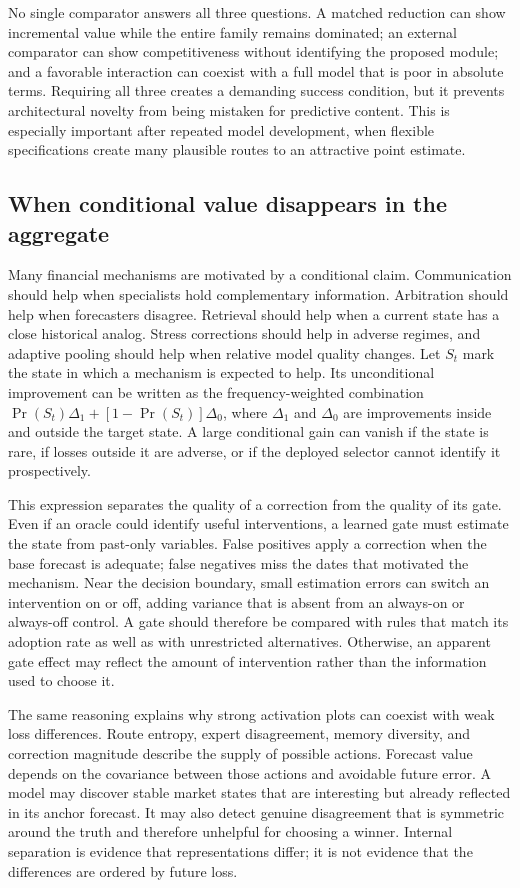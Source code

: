 \documentclass{crebss}
\begin{document}
No single comparator answers all three questions. A matched reduction can show incremental value while the entire family remains dominated; an external comparator can show competitiveness without identifying the proposed module; and a favorable interaction can coexist with a full model that is poor in absolute terms. Requiring all three creates a demanding success condition, but it prevents architectural novelty from being mistaken for predictive content. This is especially important after repeated model development, when flexible specifications create many plausible routes to an attractive point estimate.

\subsection{When conditional value disappears in the aggregate}

Many financial mechanisms are motivated by a conditional claim. Communication should help when specialists hold complementary information. Arbitration should help when forecasters disagree. Retrieval should help when a current state has a close historical analog. Stress corrections should help in adverse regimes, and adaptive pooling should help when relative model quality changes. Let $S_t$ mark the state in which a mechanism is expected to help. Its unconditional improvement can be written as the frequency-weighted combination $\Pr(S_t)\Delta_1+[1-\Pr(S_t)]\Delta_0$, where $\Delta_1$ and $\Delta_0$ are improvements inside and outside the target state. A large conditional gain can vanish if the state is rare, if losses outside it are adverse, or if the deployed selector cannot identify it prospectively.

This expression separates the quality of a correction from the quality of its gate. Even if an oracle could identify useful interventions, a learned gate must estimate the state from past-only variables. False positives apply a correction when the base forecast is adequate; false negatives miss the dates that motivated the mechanism. Near the decision boundary, small estimation errors can switch an intervention on or off, adding variance that is absent from an always-on or always-off control. A gate should therefore be compared with rules that match its adoption rate as well as with unrestricted alternatives. Otherwise, an apparent gate effect may reflect the amount of intervention rather than the information used to choose it.

The same reasoning explains why strong activation plots can coexist with weak loss differences. Route entropy, expert disagreement, memory diversity, and correction magnitude describe the supply of possible actions. Forecast value depends on the covariance between those actions and avoidable future error. A model may discover stable market states that are interesting but already reflected in its anchor forecast. It may also detect genuine disagreement that is symmetric around the truth and therefore unhelpful for choosing a winner. Internal separation is evidence that representations differ; it is not evidence that the differences are ordered by future loss.
\end{document}
